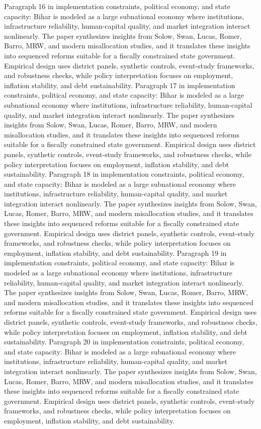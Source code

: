 \documentclass[preprint,12pt]{elsarticle}
\begin{document}
Paragraph 16 in implementation constraints, political economy, and state capacity: Bihar is modeled as a large subnational economy where institutions, infrastructure reliability, human-capital quality, and market integration interact nonlinearly. The paper synthesizes insights from Solow, Swan, Lucas, Romer, Barro, MRW, and modern misallocation studies, and it translates these insights into sequenced reforms suitable for a fiscally constrained state government. Empirical design uses district panels, synthetic controls, event-study frameworks, and robustness checks, while policy interpretation focuses on employment, inflation stability, and debt sustainability.
Paragraph 17 in implementation constraints, political economy, and state capacity: Bihar is modeled as a large subnational economy where institutions, infrastructure reliability, human-capital quality, and market integration interact nonlinearly. The paper synthesizes insights from Solow, Swan, Lucas, Romer, Barro, MRW, and modern misallocation studies, and it translates these insights into sequenced reforms suitable for a fiscally constrained state government. Empirical design uses district panels, synthetic controls, event-study frameworks, and robustness checks, while policy interpretation focuses on employment, inflation stability, and debt sustainability.
Paragraph 18 in implementation constraints, political economy, and state capacity: Bihar is modeled as a large subnational economy where institutions, infrastructure reliability, human-capital quality, and market integration interact nonlinearly. The paper synthesizes insights from Solow, Swan, Lucas, Romer, Barro, MRW, and modern misallocation studies, and it translates these insights into sequenced reforms suitable for a fiscally constrained state government. Empirical design uses district panels, synthetic controls, event-study frameworks, and robustness checks, while policy interpretation focuses on employment, inflation stability, and debt sustainability.
Paragraph 19 in implementation constraints, political economy, and state capacity: Bihar is modeled as a large subnational economy where institutions, infrastructure reliability, human-capital quality, and market integration interact nonlinearly. The paper synthesizes insights from Solow, Swan, Lucas, Romer, Barro, MRW, and modern misallocation studies, and it translates these insights into sequenced reforms suitable for a fiscally constrained state government. Empirical design uses district panels, synthetic controls, event-study frameworks, and robustness checks, while policy interpretation focuses on employment, inflation stability, and debt sustainability.
Paragraph 20 in implementation constraints, political economy, and state capacity: Bihar is modeled as a large subnational economy where institutions, infrastructure reliability, human-capital quality, and market integration interact nonlinearly. The paper synthesizes insights from Solow, Swan, Lucas, Romer, Barro, MRW, and modern misallocation studies, and it translates these insights into sequenced reforms suitable for a fiscally constrained state government. Empirical design uses district panels, synthetic controls, event-study frameworks, and robustness checks, while policy interpretation focuses on employment, inflation stability, and debt sustainability.
\end{document}
